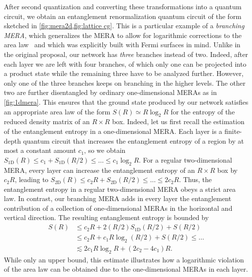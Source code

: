 \documentclass[aps,pra,reprint,superscriptaddress,floatfix,amsmath,amssymb,amsfonts]{revtex4-1}
\begin{document}
After second quantization and converting these transformations into a quantum circuit, we obtain an entanglement renormalization quantum circuit of the form sketched in \cref{fig:mera2d,fig:lattice cg}.
This is a particular example of a \emph{branching MERA}, which generalizes the MERA to allow for logarithmic corrections to the area law~\cite{evenbly2014scaling,evenbly2014real,evenbly2014branchmera} and which was explicitly built with Fermi surfaces in mind.
Unlike in the original proposal, our network has \emph{three} branches instead of two.
Indeed, after each layer we are left with four branches, of which only one can be projected into a product state while the remaining three have to be analyzed further.
However, only one of the three branches keeps on branching in the higher levels. The other two are further disentangled by ordinary one-dimensional MERAs as in \cref{fig:1dmera}.
This ensures that the ground state produced by our network satisfies an appropriate area law of the form $S(R) \simeq R \log_2 R$ for the entropy of the reduced density matrix of an $R \times R$ box.
Indeed, let us first recall the estimation of the entanglement entropy in a one-dimensional MERA.
Each layer is a finite-depth quantum circuit that increases the entanglement entropy of a region by at most a constant amount $c_1$, so we obtain $S_{\text{1D}}(R) \leq c_1 + S_{\text{1D}}(R/2) \leq \ldots \leq c_1 \log_2 R$.
For a regular two-dimensional MERA, every layer can increase the entanglement entropy of an $R \times R$ box by $c_2 R$, leading to $S_{\text{2D}}(R) \leq c_2 R + S_{\text{2D}}(R/2) \leq \ldots \leq 2c_2 R$.
Thus, the entanglement entropy in a regular two-dimensional MERA obeys a strict area law.
In contrast, our branching MERA adds in every layer the entanglement contribution of a collection of one-dimensional MERAs in the horizontal and vertical direction. The resulting entanglement entropy is bounded by
\begin{align*}
S(R) &\leq c_2 R + 2 (R/2) S_{\text{1D}}(R/2) + S(R/2)\\
&\leq c_2 R + c_1 R \log_2(R/2) + S(R/2)
\leq \ldots \\
&\lesssim 2 c_1 R \log_2 R + (2 c_2 - 4 c_1) R.
\end{align*}
While only an upper bound, this estimate illustrates how a logarithmic violation of the area law can be obtained due to the one-dimensional MERAs in each layer.
\end{document}
